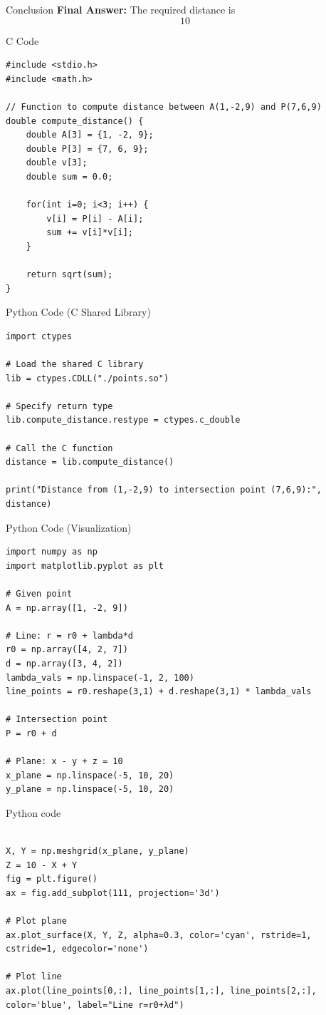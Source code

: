 \documentclass{beamer}
\begin{document}
	
	\begin{frame}{Conclusion}
	\textbf{Final Answer: } The required distance is 
	\[
	\boxed{10}
	\]
	\end{frame}
	
	
	\begin{frame}[fragile]{C Code}
	\begin{lstlisting}
#include <stdio.h>
#include <math.h>

// Function to compute distance between A(1,-2,9) and P(7,6,9)
double compute_distance() {
    double A[3] = {1, -2, 9};
    double P[3] = {7, 6, 9};
    double v[3];
    double sum = 0.0;

    for(int i=0; i<3; i++) {
        v[i] = P[i] - A[i];
        sum += v[i]*v[i];
    }

    return sqrt(sum);
}
	\end{lstlisting}
	\end{frame}
	
	
	\begin{frame}[fragile]{Python Code (C Shared Library)}
	\begin{lstlisting}
import ctypes

# Load the shared C library
lib = ctypes.CDLL("./points.so")

# Specify return type
lib.compute_distance.restype = ctypes.c_double

# Call the C function
distance = lib.compute_distance()

print("Distance from (1,-2,9) to intersection point (7,6,9):", distance)
	\end{lstlisting}
	\end{frame}
	
	
	\begin{frame}[fragile]{Python Code (Visualization)}
	\begin{lstlisting}
import numpy as np
import matplotlib.pyplot as plt

# Given point
A = np.array([1, -2, 9])

# Line: r = r0 + lambda*d
r0 = np.array([4, 2, 7])
d = np.array([3, 4, 2])
lambda_vals = np.linspace(-1, 2, 100)
line_points = r0.reshape(3,1) + d.reshape(3,1) * lambda_vals

# Intersection point
P = r0 + d

# Plane: x - y + z = 10
x_plane = np.linspace(-5, 10, 20)
y_plane = np.linspace(-5, 10, 20)
\end{lstlisting}
	\end{frame}
	
	
	\begin{frame}[fragile]{Python code}
    \begin{lstlisting}
        
X, Y = np.meshgrid(x_plane, y_plane)
Z = 10 - X + Y
fig = plt.figure()
ax = fig.add_subplot(111, projection='3d')

# Plot plane
ax.plot_surface(X, Y, Z, alpha=0.3, color='cyan', rstride=1, cstride=1, edgecolor='none')

# Plot line
ax.plot(line_points[0,:], line_points[1,:], line_points[2,:], color='blue', label="Line r=r0+λd")
\end{lstlisting}
	\end{frame}
\end{document}
